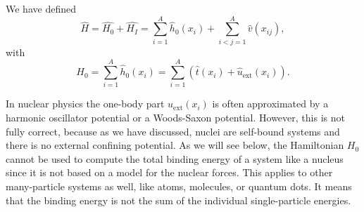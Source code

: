 We have defined
\[
    \hat{H} = \hat{H_0} + \hat{H_I} = \sum_{i=1}^A \hat{h}_0(x_i) +
    \sum_{i<j=1}^A \hat{v}(x_{ij}),
\]
with
\[
  H_0=\sum_{i=1}^A \hat{h}_0(x_i) = \sum_{i=1}^A\left(\hat{t}(x_i) +
  \hat{u}_{\mathrm{ext}}(x_i)\right).
\]

In nuclear physics the one-body part $u_{\mathrm{ext}}(x_i)$ is often
approximated by a harmonic oscillator potential or a Woods-Saxon
potential. However, this is not fully correct, because as we have
discussed, nuclei are self-bound systems and there is no external
confining potential. As we will see below, the Hamiltonian $H_0$ cannot be used to
  compute the total binding energy of a system like a nucleus since it is not based on a
  model for the nuclear forces. This applies to other many-particle systems as well, like atoms, molecules, or 
quantum dots. It means that the binding energy is not
the sum of the individual single-particle energies.

